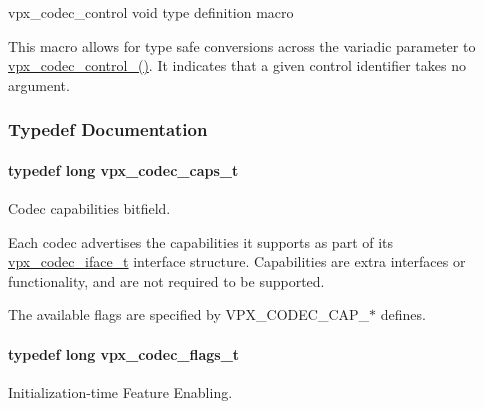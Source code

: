 vpx\+\_\+codec\+\_\+control void type definition macro 

This macro allows for type safe conversions across the variadic parameter to \hyperlink{group__codec_gaf7849b69cc390b21d889c8c71f69ec14}{vpx\+\_\+codec\+\_\+control\+\_\+()}. It indicates that a given control identifier takes no argument. 

\subsubsection{Typedef Documentation}
\paragraph[{\texorpdfstring{vpx\+\_\+codec\+\_\+caps\+\_\+t}{vpx_codec_caps_t}}]{\setlength{\rightskip}{0pt plus 5cm}typedef long {\bf vpx\+\_\+codec\+\_\+caps\+\_\+t}}\hypertarget{group__codec_gad2b690c0ef83cbd83a7234078791913f}{}\label{group__codec_gad2b690c0ef83cbd83a7234078791913f}


Codec capabilities bitfield. 

Each codec advertises the capabilities it supports as part of its \hyperlink{group__codec_gae99c3b04f4a567a311211cce3ae6b83b}{vpx\+\_\+codec\+\_\+iface\+\_\+t} interface structure. Capabilities are extra interfaces or functionality, and are not required to be supported.

The available flags are specified by V\+P\+X\+\_\+\+C\+O\+D\+E\+C\+\_\+\+C\+A\+P\+\_\+$\ast$ defines. 
\paragraph[{\texorpdfstring{vpx\+\_\+codec\+\_\+flags\+\_\+t}{vpx_codec_flags_t}}]{\setlength{\rightskip}{0pt plus 5cm}typedef long {\bf vpx\+\_\+codec\+\_\+flags\+\_\+t}}\hypertarget{group__codec_ga3b36d5af89ddc463489fe5bde0a57877}{}\label{group__codec_ga3b36d5af89ddc463489fe5bde0a57877}


Initialization-\/time Feature Enabling. 

